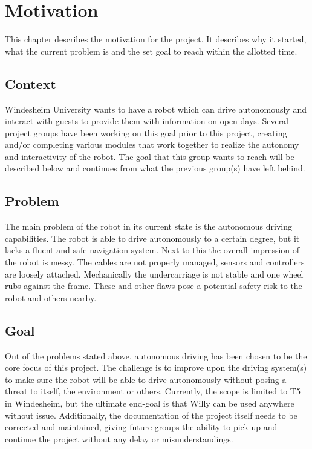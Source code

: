 \section{Motivation}
This chapter describes the motivation for the project. 
It describes why it started, what the current problem is and the set goal to reach within the allotted time.

\subsection{Context}
Windesheim University wants to have a robot which can drive autonomously and interact with guests to provide them with information on open days.
Several project groups have been working on this goal prior to this project, creating and/or completing various modules that work together to realize the autonomy and interactivity of the robot.
The goal that this group wants to reach will be described below and continues from what the previous group(s) have left behind.

\subsection{Problem}
The main problem of the robot in its current state is the autonomous driving capabilities. 
The robot is able to drive autonomously to a certain degree, but it lacks a fluent and safe navigation system. 
Next to this the overall impression of the robot is messy. 
The cables are not properly managed, sensors and controllers are loosely attached. 
Mechanically the undercarriage is not stable and one wheel rubs against the frame. 
These and other flaws pose a potential safety risk to the robot and others nearby. 

\subsection{Goal}
Out of the problems stated above, autonomous driving has been chosen to be the core focus of this project. 
The challenge is to improve upon the driving system(s) to make sure the robot will be able to drive autonomously without posing a threat to itself, the environment or others.
Currently, the scope is limited to T5 in Windesheim, but the ultimate end-goal is that Willy can be used anywhere without issue.
Additionally, the documentation of the project itself needs to be corrected and maintained, giving future groups the ability to pick up and continue the project without any delay or misunderstandings.

